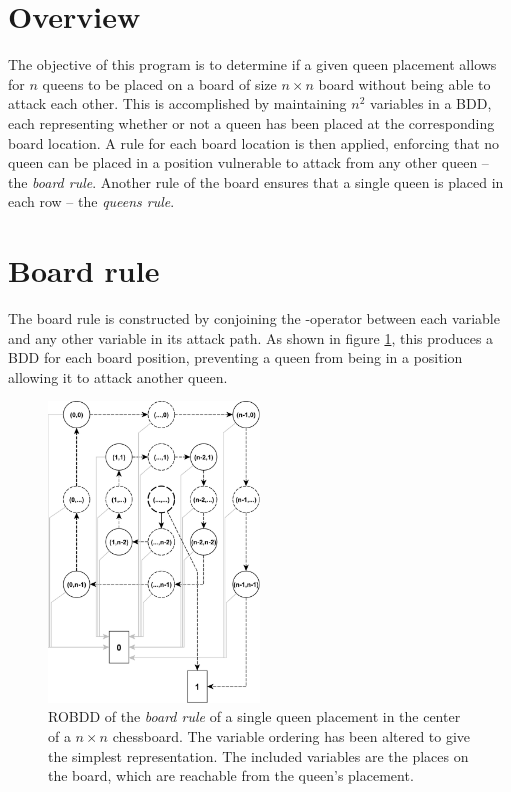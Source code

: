 \documentclass{report}
\begin{document}
	

	\section*{Overview} 
	\label{sub:overview}
	The objective of this program is to determine if a given queen placement allows for $n$ queens to be placed on a board of size $n \times n$ board without being able to attack each other.
	This is accomplished by maintaining $n^2$ variables in a BDD, each representing whether or not a queen has been placed at the corresponding board location.
	A rule for each board location is then applied, enforcing that no queen can be placed in a position vulnerable to attack from any other queen -- the \emph{board rule}.
	Another rule of the board ensures that a single queen is placed in each row -- the \emph{queens rule}.

	\section*{Board rule} 
	\label{sub:boardrule}
	The board rule is constructed by conjoining the -operator between each variable and any other variable in its attack path.
	As shown in figure \ref{fig1}, this produces a BDD for each board position, preventing a queen from being in a position allowing it to attack another queen.
	
	\vspace{\fill}
	\begin{figure}[h]
		\begin{centering}
			\includegraphics[width=0.5\textwidth]{figures/board-rule.pdf}
			\caption{ROBDD of the \emph{board rule} of a single queen placement in the center of a $n \times n$ chessboard. The variable ordering has been altered to give the simplest representation. The included variables are the places on the board, which are reachable from the queen's placement.}
		\end{centering}
		\label{fig1}
	\end{figure}
	\FloatBarrier
\end{document}
